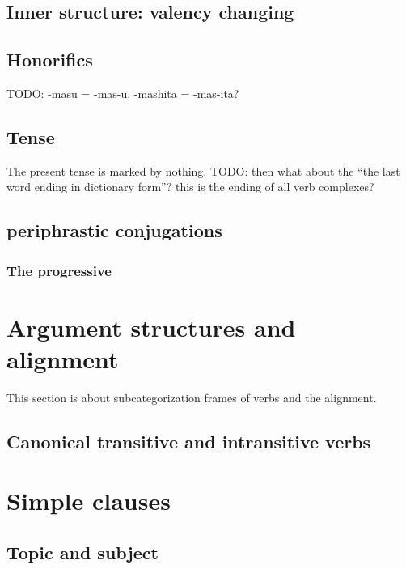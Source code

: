 \documentclass[UTF8, a4paper, oneside, scheme=plain]{ctexart}
\begin{document}
\subsection{Inner structure: valency changing}



\subsection{Honorifics}

TODO: 
-masu = -mas-u, -mashita = -mas-ita?

\subsection{Tense}

The present tense is marked by nothing. TODO: then what about the ``the last word ending in dictionary form''? this is the ending of all verb complexes?

\subsection{periphrastic conjugations}

\subsubsection{The progressive}

\section{Argument structures and alignment}\label{sec:arguments}

This section is about subcategorization frames of verbs and the alignment.

\subsection{Canonical transitive and intransitive verbs}

\section{Simple clauses}

\subsection{Topic and subject}\label{sec:topic-subject}
\end{document}

